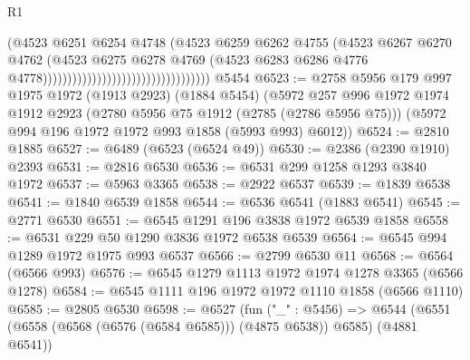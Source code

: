 \begin{lexlean}{R1}
\begin{coremodule}
                                                              (@4523
                                                                @6251
                                                                @6254
                                                                @4748
                                                                (@4523
                                                                  @6259
                                                                  @6262
                                                                  @4755
                                                                  (@4523
                                                                    @6267
                                                                    @6270
                                                                    @4762
                                                                    (@4523
                                                                      @6275
                                                                      @6278
                                                                      @4769
                                                                      (@4523
                                                                        @6283
                                                                        @6286
                                                                        @4776
                                                                        @4778))))))))))))))))))))))))))))))))))
    @5454
@6523 := @2758
    @5956
    @179
    @997
    @1975
    @1972
    (@1913 @2923)
    (@1884 @5454)
    (@5972
      @257
      @996
      @1972
      @1974
      @1912
      @2923
      (@2780 @5956 @75 @1912 (@2785 (@2786 @5956 @75)))
      (@5972 @994 @196 @1972 @1972 @993 @1858 (@5993 @993) @6012))
@6524 := @2810 @1885
@6527 := @6489 (@6523 (@6524 @49))
@6530 := @2386 (@2390 @1910) @2393
@6531 := @2816 @6530
@6536 := @6531 @299 @1258 @1293 @3840 @1972
@6537 := @5963 @3365
@6538 := @2922 @6537
@6539 := @1839 @6538
@6541 := @1840 @6539 @1858
@6544 := @6536 @6541 (@1883 @6541)
@6545 := @2771 @6530
@6551 := @6545 @1291 @196 @3838 @1972 @6539 @1858
@6558 := @6531 @229 @50 @1290 @3836 @1972 @6538 @6539
@6564 := @6545 @994 @1289 @1972 @1975 @993 @6537
@6566 := @2799 @6530 @11
@6568 := @6564 (@6566 @993)
@6576 := @6545 @1279 @1113 @1972 @1974 @1278 @3365 (@6566 @1278)
@6584 := @6545 @1111 @196 @1972 @1972 @1110 @1858 (@6566 @1110)
@6585 := @2805 @6530
@6598 := @6527
    (fun ("_" : @5456) =>
    @6544 (@6551 (@6558 (@6568 (@6576 (@6584 @6585))) (@4875 @6538)) @6585) (@4881 @6541))

\end{coremodule}
\end{lexlean}
